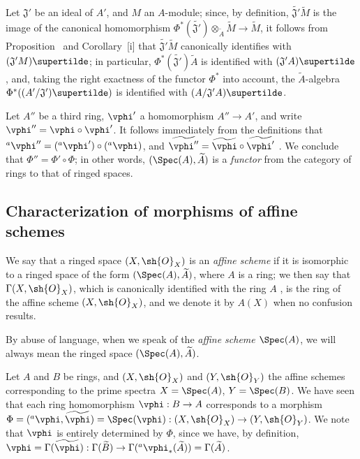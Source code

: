 \begin{env}[1.6.9]
\label{I.1.6.9}
Let $\mathfrak{J}'$ be an ideal of $A'$, and $M$ an $A$-module;
since, by definition, $\widetilde{\mathfrak{J}'}\widetilde{M}$ is the image of the canonical homomorphism $\Phi^*(\widetilde{\mathfrak{J}'})\otimes_{\widetilde{A}}\widetilde{M}\to\widetilde{M}$, it
follows from Proposition~ and Corollary~[i] that
$\widetilde{\mathfrak{J}'}\widetilde{M}$ canonically identifies with $(\mathfrak{J}' M)\supertilde$;
in particular, $\Phi^*(\widetilde{\mathfrak{J}'})\widetilde{A}$ is identified with $(\mathfrak{J}' A)\supertilde$, and, taking the right exactness of the functor $\Phi^*$ into account,
the $\widetilde{A}$-algebra $\Phi^*((A'/\mathfrak{J}')\supertilde)$ is identified with $(A/\mathfrak{J}' A)\supertilde$.
\end{env}

\begin{env}[1.6.10]
\label{I.1.6.10}
Let $A''$ be a third ring, $\vphi'$ a homomorphism $A''\to A'$, and write $\vphi''=\vphi\circ\vphi'$.
It follows immediately from the definitions that ${}^a\vphi''=({}^a\vphi')\circ({}^a\vphi)$, and $\widetilde{\vphi''}=\widetilde{\vphi}\circ\widetilde{\vphi'}$ . We conclude that $\Phi''=\Phi'\circ\Phi$;
in other words, $(\Spec(A),\widetilde{A})$ is a \emph{functor} from the category of rings to that of ringed spaces.
\end{env}

\subsection{Characterization of morphisms of affine schemes}
\label{subsection:I.1.7}

\begin{definition}[1.7.1]
\label{I.1.7.1}
We say that a ringed space $(X,\sh{O}_X)$ is an \emph{affine scheme} if it is isomorphic to a ringed space of the form $(\Spec(A),\widetilde{A})$, where $A$ is a ring;
we then say that $\Gamma(X,\sh{O}_X)$, which is canonically identified with the ring $A$ , is the ring of the affine scheme $(X,\sh{O}_X)$, and we denote it by $A(X)$ when no confusion results.
\end{definition}

By abuse of language, when we speak of the \emph{affine scheme $\Spec(A)$}, we will always mean the ringed space $(\Spec(A),\widetilde{A})$.
\begin{env}[1.7.2]
\label{I.1.7.2}
Let $A$ and $B$ be rings, and $(X,\sh{O}_X)$ and $(Y,\sh{O}_Y)$ the affine schemes corresponding to the prime spectra $X=\Spec(A)$, $Y=\Spec(B)$.
We have seen  that each ring homomorphism $\vphi:B\to A$ corresponds to a morphism $\Phi=({}^a\vphi,\widetilde{\vphi})=\Spec(\vphi):(X,\sh{O}_X)\to(Y,\sh{O}_Y)$.
We note that $\vphi$ is entirely determined by $\Phi$, since we have, by definition, $\vphi=\Gamma(\widetilde{\vphi}):\Gamma(\widetilde{B})\to\Gamma({}^a\vphi_*(\widetilde{A}))=\Gamma(\widetilde{A})$.
\end{env}


